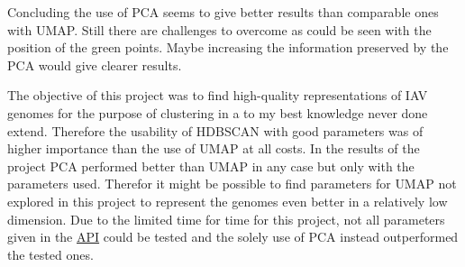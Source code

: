 
Concluding the use of \gls{PCA} seems to give better results than comparable ones with \gls{UMAP}. Still there are challenges to overcome as could be seen with the position of the green points. Maybe increasing the information preserved by the \gls{PCA} would give clearer results. 

The objective of this project was to find high-quality representations of \gls{IAV} genomes for the purpose of clustering in a to my best knowledge never done extend. Therefore the usability of \gls{HDBSCAN} with good parameters was of higher importance than the use of \gls{UMAP} at all costs. In the results of the project \gls{PCA} performed better than \gls{UMAP} in any case but only with the parameters used. Therefor it might be possible to find parameters for \gls{UMAP} not explored in this project to represent the genomes even better in a relatively low dimension. Due to the limited time for time for this project, not all parameters given in the \href{https://umap-learn.readthedocs.io/en/latest/api.html}{API} could be tested and the solely use of \gls{PCA} instead outperformed the tested ones. 